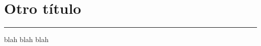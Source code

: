 
\chapter{Otro título}\label{capit:cap7}
\vspace{-2.0325ex}%
\noindent
\rule{\textwidth}{0.5pt}
\vspace{-5.5ex}%
\newcommand{\pushline}{\Indp}%

blah blah blah \citep{Chalder1993}


\newpage
